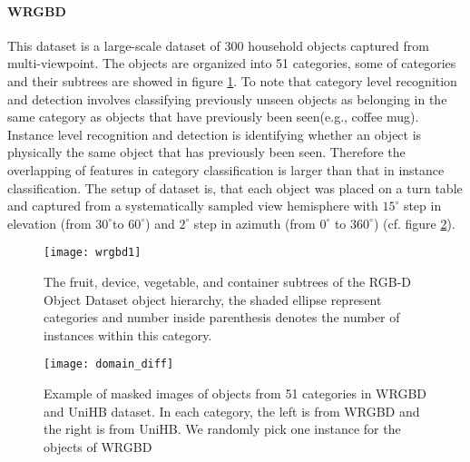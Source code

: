\paragraph{WRGBD\cite{lai2011large}} This dataset is a large-scale dataset of 300 household objects captured from multi-viewpoint. The objects are organized into 51 categories, some of categories and their subtrees are showed in figure \ref{fig:wrgbd1}. To note that category level recognition and detection involves classifying previously unseen objects as belonging in the same category as objects that have previously been seen(e.g., coffee
mug). Instance level recognition and detection is identifying
whether an object is physically the same object that has
previously been seen. Therefore the overlapping of features in category classification is larger than that in instance classification. The setup of dataset is, that each object was placed on a turn table and captured from a systematically sampled view hemisphere with $15^{\circ}$ step in elevation (from $30^{\circ}$to $60^{\circ}$) and $2^\circ$ step in azimuth (from $0^\circ$ to $360^\circ$) (cf. figure \ref{fig:wrgbd2}).
\begin{figure}[h!]
	\begin{center}
		\texttt{[image: wrgbd1]}
		\caption{The fruit, device, vegetable, and container subtrees of the RGB-D Object Dataset object hierarchy, the shaded ellipse represent categories and number inside parenthesis denotes the number of instances within this category\cite{lai2011large}.}		
		\label{fig:wrgbd1}
	\end{center} 
\end{figure}
 \begin{figure}[h!]
 	\begin{center}
 		\texttt{[image: domain\_diff]}
 		\caption{Example of masked images of objects from 51 categories in WRGBD and UniHB dataset. In each category, the left is from WRGBD and the right is from UniHB. We randomly pick one instance for the objects of WRGBD}		
 		\label{fig:wrgbd2}
 	\end{center}
 \end{figure}
 

